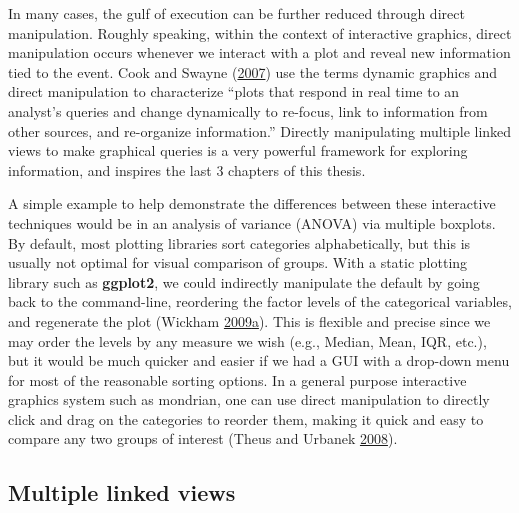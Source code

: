 \documentclass[12pt,]{isuthesis}
\begin{document}
In many cases, the gulf of execution can be further reduced through
direct manipulation. Roughly speaking, within the context of interactive
graphics, direct manipulation occurs whenever we interact with a plot
and reveal new information tied to the event. Cook and Swayne
(\protect\hyperlink{ref-ggobi:2007}{2007}) use the terms dynamic
graphics and direct manipulation to characterize ``plots that respond in
real time to an analyst's queries and change dynamically to re-focus,
link to information from other sources, and re-organize information.''
Directly manipulating multiple linked views to make graphical queries is
a very powerful framework for exploring information, and inspires the
last 3 chapters of this thesis.

A simple example to help demonstrate the differences between these
interactive techniques would be in an analysis of variance (ANOVA) via
multiple boxplots. By default, most plotting libraries sort categories
alphabetically, but this is usually not optimal for visual comparison of
groups. With a static plotting library such as \textbf{ggplot2}, we
could indirectly manipulate the default by going back to the
command-line, reordering the factor levels of the categorical variables,
and regenerate the plot (Wickham
\protect\hyperlink{ref-ggplot2}{2009}\protect\hyperlink{ref-ggplot2}{a}).
This is flexible and precise since we may order the levels by any
measure we wish (e.g., Median, Mean, IQR, etc.), but it would be much
quicker and easier if we had a GUI with a drop-down menu for most of the
reasonable sorting options. In a general purpose interactive graphics
system such as mondrian, one can use direct manipulation to directly
click and drag on the categories to reorder them, making it quick and
easy to compare any two groups of interest (Theus and Urbanek
\protect\hyperlink{ref-mondrianbook}{2008}).

\subsection{Multiple linked views}\label{multiple-linked-views}
\end{document}
